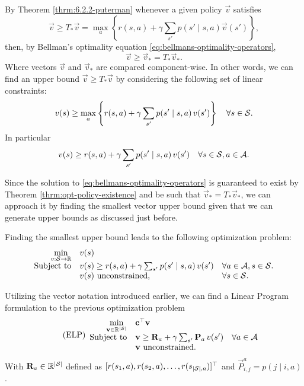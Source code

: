 By Theorem \ref{thrm:6.2.2-puterman} whenever a given policy $\vec{v}$ satisfies
\[
    \vec{v} \geq T_* \vec{v} = \max_{a} \left\{ r(s, a) + \gamma \sum_{s'} p(s' \mid s, a) \vec{v}(s') \right\},
\]
then, by Bellman's optimality equation
\eqref{eq:bellmans-optimality-operators},
\[
    \vec{v} \geq \vec{v}_* = T_* \vec{v}_*.
\]
Where vectors $\vec{v}$ and $\vec{v}_*$ are compared component-wise. In other
words, we can find an upper bound $\vec{v} \geq T_{*} \vec{v}$ by considering
the following set of linear constraints:
\[
    v(s) \geq \max_{a} \left\{ r(s, a) + \gamma \sum_{s'} p(s' \mid s, a) \, v(s') \right\} \quad \forall s \in \mathcal{S}.
\]
In particular
\begin{equation}
    v(s) \geq r(s, a) + \gamma \sum_{s'} p(s' \mid s, a) \, v(s') \quad \forall s \in \mathcal{S}, a \in \mathcal{A}.
\end{equation}

Since the solution to \eqref{eq:bellmans-optimality-operators} is guaranteed to
exist by Theorem \ref{thrm:opt-policy-existence} and be such that $\vec{v}_* =
T_* \vec{v}_*$, we can approach it by finding the smallest vector upper bound
given that we can generate upper bounds as discussed just before.

Finding the smallest upper bound leads to the following optimization problem:
\begin{equation}
\begin{array}{rl@{}ll}
    \displaystyle \min_{v: \States \to \R} & v(s) \\
    \text{Subject to} & v(s) \geq r(s,a) + \gamma \sum_{s'} p(s' \mid s, a) \, v(s') & \quad \forall a \in \Actions, s \in \States. \\
    & v(s) \text{ unconstrained,} & \quad \forall s \in \States.
\end{array}
\end{equation}

Utilizing the vector notation introduced earlier, we can find a Linear Program formulation to the previous optimization problem
\begin{equation}
\label{lp:exact-lp}
\tag{ELP}
\begin{array}{rl@{}ll}
    \displaystyle \min_{\vec{v} \in \R^{|\States|}} & \vec{c}^{\top} \vec{v} \\
    \text{Subject to} & \vec{v} \geq \vec{R}_a + \gamma \sum_{s'} \vec{P}_a \, v(s') & \quad \forall a \in \Actions \\
    & \vec{v} \text{ unconstrained.} &
\end{array}
\end{equation}
With $\mathbf{R}_a \in \mathbb{R}^{|\mathcal{S}|}$ defined as $[r(s_1, a), r(s_2, a), \dots,
r(s_{|\mathcal{S}|, a})]^{\top}$ and $\vec{P}_{i,j}^{a} = p(j \mid i, a)$.

